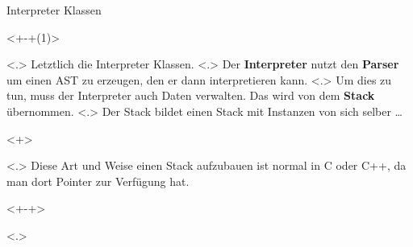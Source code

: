   \begin{frame}{Interpreter Klassen}
    \begin{uncoverenv}<+-+(1)>%
          \note[item]<.>{
            Letztlich die Interpreter Klassen.
          }
          \note[item]<.>{
            Der \textbf{Interpreter} nutzt den \textbf{Parser} um einen AST zu erzeugen, den er dann interpretieren kann.
          }
          \note[item]<.>{
            Um dies zu tun, muss der Interpreter auch Daten verwalten. Das wird von dem \textbf{Stack} übernommen.
          }
          \note[item]<.>{
            Der Stack bildet einen Stack mit Instanzen von sich selber \ldots
          }
      \begin{uncoverenv}<+>%
      \end{uncoverenv}%
          \note[item]<.>{
             Diese Art und Weise einen Stack aufzubauen ist normal in C oder C++, da man dort Pointer zur Verfügung hat.
          }
    \end{uncoverenv}
    \begin{uncoverenv}<+-+>%
          \note[item]<.>{
}
\end{uncoverenv}
\end{frame}
